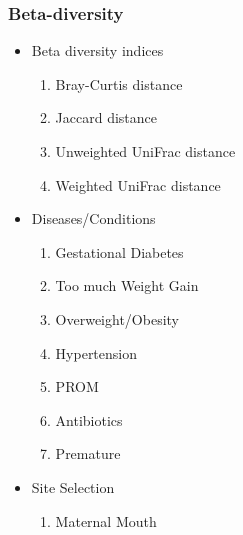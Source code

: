 \documentclass{beamer}
\begin{document}
    \begin{frame}
        \frametitle{Beta-diversity}

        \begin{itemize}
            \item Beta diversity indices
            \begin{enumerate}
                \item Bray-Curtis distance
                \item Jaccard distance
                \item Unweighted UniFrac distance
                \item Weighted UniFrac distance
            \end{enumerate}

            \item Diseases/Conditions
            \begin{enumerate}
                \item Gestational Diabetes
                \item Too much Weight Gain
                \item Overweight/Obesity
                \item Hypertension
                \item PROM
                \item Antibiotics
                \item Premature
            \end{enumerate}

            \item Site Selection
            \begin{enumerate}
                \item Maternal Mouth
            \end{enumerate}
        \end{itemize}
    \end{frame}
\end{document}

